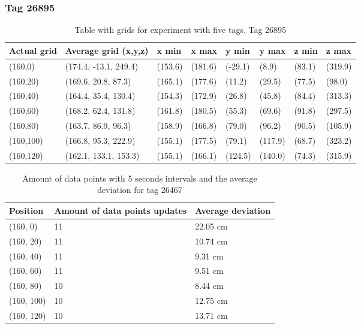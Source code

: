 \subsubsection{Tag 26895}
\begin{table}[H] 
    \centering
    \begin{tabular}{|l|l|l|l|l|l|l|l|}
    \hline
    Actual grid & Average grid (x,y,z)   & x min    & x max     & y min      & y max   & z min   & z max    \\ \hline
    (160,0) 	& (174.4, -13.1, 249.4)  & (153.6) 	& (181.6)	& (-29.1)	 & (8.9) 	 & (83.1)	 & (319.9)	\\ \hline
    (160,20) 	& (169.6, 20.8, 87.3) 	 & (165.1) 	& (177.6)	& (11.2)	 & (29.5) 	 & (77.5)	 & (98.0)	\\ \hline
    (160,40) 	& (164.4, 35.4, 130.4) 	 & (154.3) 	& (172.9)	& (26.8)	 & (45.8) 	 & (84.4)	 & (313.3)	\\ \hline
    (160,60) 	& (168.2, 62.4, 131.8) 	 & (161.8) 	& (180.5)	& (55.3)	 & (69.6) 	 & (91.8)	 & (297.5)	\\ \hline
    (160,80) 	& (163.7, 86.9, 96.3) 	 & (158.9) 	& (166.8)	& (79.0)	 & (96.2) 	 & (90.5)	 & (105.9)	\\ \hline
    (160,100) 	& (166.8, 95.3, 222.9) 	 & (155.1) 	& (177.5)	& (79.1)	 & (117.9) 	 & (68.7)	 & (323.2)	\\ \hline
    (160,120) 	& (162.1, 133.1, 153.3) 	 & (155.1) 	& (166.1)	& (124.5)	 & (140.0) 	 & (74.3)	 & (315.9)	\\ \hline
    \end{tabular}
\caption{Table with grids for experiment with five tags. Tag 26895}
\end{table}

\begin{table}[H]
    \centering
    \begin{tabular}{|l|l|l|}
    \hline
    Position   & Amount of data points updates & Average deviation \\ \hline
    (160, 0)   & 11                &  22.05 cm                 \\ \hline
    (160, 20)  & 11                &  10.74 cm                 \\ \hline
    (160, 40)  & 11                &  9.31 cm                 \\ \hline
    (160, 60)  & 11                &  9.51 cm                 \\ \hline
    (160, 80)  & 10                &  8.44 cm                 \\ \hline
    (160, 100) & 10                &  12.75 cm                 \\ \hline
    (160, 120) & 10                &  13.71 cm                 \\ \hline
    \end{tabular}
    \caption{Amount of data points with 5 seconds intervals and the average deviation for tag 26467}
\end{table}

